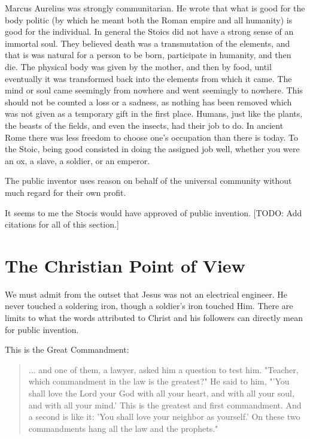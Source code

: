 \documentclass[
	fontsize=10pt, %
	twoside=false, %
	secnumdepth=1, %
]{kaobook}
\begin{document}
Marcus Aurelius was strongly communitarian.
He wrote that what is good for the body politic (by which
he meant both the Roman empire and all humanity) is good
for the individual.
In general the Stoics did not have a strong sense of
an immortal soul.
They believed death was a transmutation of the elements,
and that is was natural for a person to be born, participate
in humanity, and then die.
The physical body was given by the mother, and
then by food, until eventually it was transformed back into
the elements from which it came.
The mind or soul came seemingly from nowhere and went
seemingly to nowhere.
This should not be counted a loss
or a sadness, as nothing has been removed which was not
given as a temporary gift in the first place.
Humans, just like the plants, the beasts of the fields,
and even the insects, had their job to do.
In ancient Rome there was less freedom to choose
one's occupation than there is today.
To the Stoic, being good consisted in doing the assigned job
well, whether you were an ox, a slave, a soldier, or an emperor.

The public inventor uses reason on behalf of the
universal community without much regard for their own
profit.

It seems to me the Stocis would have approved of public invention.
[TODO: Add citations for all of this section.]

\chapter{The Christian Point of View}


We must admit from the outset that Jesus was not
an electrical engineer.
He never touched a soldering iron, though a soldier's iron touched Him.
There are limits to what the words attributed to Christ and his followers
can directly mean for public invention.

This is the Great Commandment:
\blockquote{
... and one of them, a lawyer, asked him a question to test
him. "Teacher, which commandment in the law is the greatest?" He said
to him, "'You shall love the Lord your God with all your heart, and
with all your soul, and with all your mind.' This is the greatest and
first commandment. And a second is like it: 'You shall love your
neighbor as yourself.' On these two commandments hang all the law and
the prophets."
}
\end{document}
